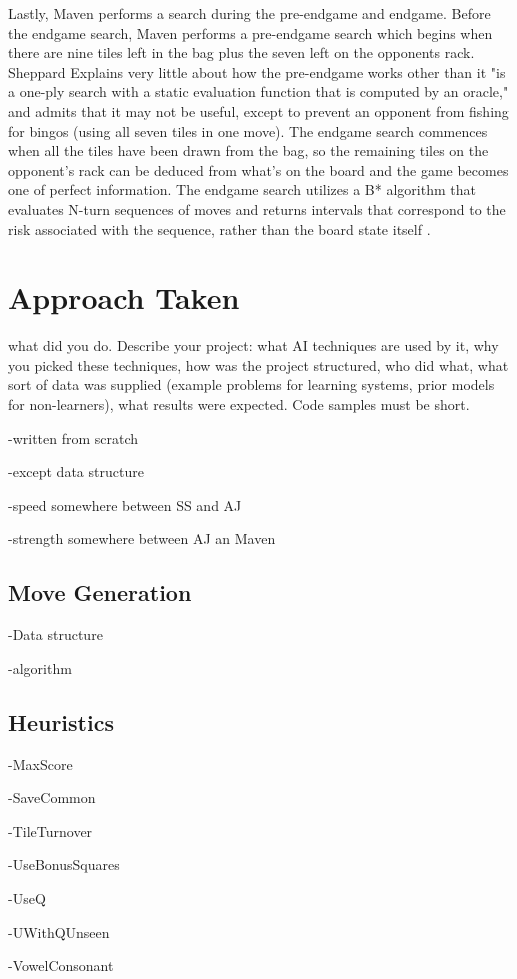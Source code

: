 \documentclass[letterpaper]{article}
\begin{document}
Lastly, Maven performs a search during the pre-endgame and endgame. Before the endgame search, Maven performs a pre-endgame search which begins when there are nine tiles left in the bag plus the seven left on the opponents rack. Sheppard Explains very little about how the pre-endgame works other than it "is a one-ply search with a static evaluation function that is computed by an oracle," and admits that it may not be useful, except to prevent an opponent from fishing for bingos (using all seven tiles in one move). The endgame search commences when all the tiles have been drawn from the bag, so the remaining tiles on the opponent's rack can be deduced from what's on the board and the game becomes one of perfect information. The endgame search utilizes a B* algorithm that evaluates N-turn sequences of moves and returns intervals that correspond to the risk associated with the sequence, rather than the board state itself \cite{1sheppard2002}.

\section{Approach Taken}
what did you do. Describe your project: what AI techniques are used by it, why you picked these techniques, how was the project structured, who did what, what sort of data was supplied (example problems for learning systems, prior models for non-learners), what results were expected. Code samples must be short.

-written from scratch

-except data structure

-speed somewhere between SS and AJ

-strength somewhere between AJ an Maven

\subsection{Move Generation}
-Data structure

-algorithm
\subsection{Heuristics}
-MaxScore

-SaveCommon

-TileTurnover

-UseBonusSquares

-UseQ

-UWithQUnseen

-VowelConsonant
\end{document}
